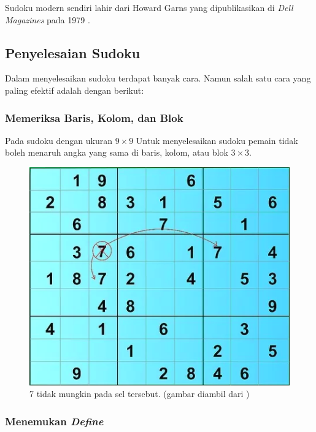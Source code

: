 Sudoku modern sendiri lahir dari  Howard Garns yang dipublikasikan di \textit{Dell Magazines} pada 1979 \cite{SATPy5}.	

\subsection{Penyelesaian Sudoku}

Dalam menyelesaikan sudoku terdapat banyak cara. Namun salah satu cara yang paling efektif adalah dengan berikut: 

\subsubsection{Memeriksa Baris, Kolom, dan Blok}

Pada sudoku dengan ukuran $9 \times 9$ Untuk menyelesaikan sudoku pemain tidak boleh menaruh angka yang sama di baris, kolom, atau blok ${3 \times 3}$.

\begin{figure}[H]
	\begin{centering}
		\includegraphics[scale=0.7]{gambar/solve1}
		
		\caption{7 tidak mungkin pada sel tersebut. (gambar diambil dari \cite{Sud12})}
	\end{centering}
\end{figure}

\subsubsection{Menemukan \textit{Define}}


